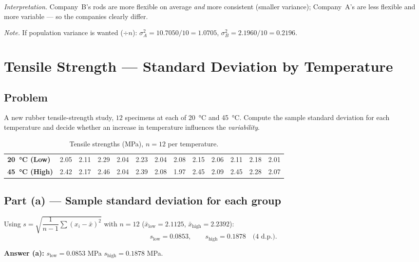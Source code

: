 \documentclass[11pt]{article}
\begin{document}
\noindent
\emph{Interpretation.} Company~B's rods are more flexible on average \emph{and}
more consistent (smaller variance); Company~A's are less flexible and more
variable --- so the companies clearly differ.

\medskip
\noindent\footnotesize\emph{Note.} If population variance is wanted ($\div n$):
$\sigma_A^2 = 10.7050/10 = 1.0705$, $\sigma_B^2 = 2.1960/10 = 0.2196$.

\section{Tensile Strength --- Standard Deviation by Temperature}

\subsection*{Problem}
A new rubber tensile-strength study, $12$ specimens at each of \SI{20}{\celsius}
and \SI{45}{\celsius}. Compute the sample standard deviation for each temperature
and decide whether an increase in temperature influences the \emph{variability}.

\begin{table}[H]
\centering
\renewcommand{\arraystretch}{1.25}
\begin{tabular}{l *{12}{c}}
\toprule
\textbf{\SI{20}{\celsius} (Low)}
 & 2.05 & 2.11 & 2.29 & 2.04 & 2.23 & 2.04 & 2.08 & 2.15 & 2.06 & 2.11 & 2.18 & 2.01 \\
\textbf{\SI{45}{\celsius} (High)}
 & 2.42 & 2.17 & 2.46 & 2.04 & 2.39 & 2.08 & 1.97 & 2.45 & 2.09 & 2.45 & 2.28 & 2.07 \\
\bottomrule
\end{tabular}
\caption{Tensile strengths (MPa), $n=12$ per temperature.}
\end{table}

\subsection*{Part (a) — Sample standard deviation for each group}

\noindent
Using $s=\sqrt{\dfrac{1}{n-1}\sum (x_i-\bar{x})^2}$ with $n=12$
($\bar{x}_{\text{low}}=2.1125$, $\bar{x}_{\text{high}}=2.2392$):
\[
s_{\text{low}}=0.0853,\qquad s_{\text{high}}=0.1878
\quad\text{(4 d.p.)}.
\]

\begin{answerbox}
\textbf{Answer (a):}\quad
$s_{\text{low}} = 0.0853$ MPa \qquad $s_{\text{high}} = 0.1878$ MPa.
\end{answerbox}
\end{document}
